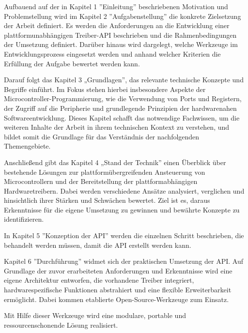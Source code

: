 Aufbauend auf der in Kapitel 1 ''Einleitung'' beschriebenen Motivation und Problemstellung wird im Kapitel 2 ''Aufgabenstellung'' die konkrete Zielsetzung der Arbeit definiert.
Es werden die Anforderungen an die Entwicklung einer plattformunabhängigen Treiber-API beschrieben und die Rahmenbedingungen der Umsetzung definiert.
Darüber hinaus wird dargelegt, welche Werkzeuge im Entwicklungsprozess eingesetzt werden und anhand welcher Kriterien die Erfüllung der Aufgabe bewertet werden kann.

Darauf folgt das Kapitel 3 „Grundlagen”, das relevante technische Konzepte und Begriffe einführt. 
Im Fokus stehen hierbei insbesondere Aspekte der Microcontroller-Programmierung, wie die Verwendung von Ports und Registern, der Zugriff auf die Peripherie und grundlegende Prinzipien der hardwarenahen Softwareentwicklung. 
Dieses Kapitel schafft das notwendige Fachwissen, um die weiteren Inhalte der Arbeit in ihrem technischen Kontext zu verstehen, und bildet somit die Grundlage für das Verständnis der nachfolgenden Themengebiete.

Anschließend gibt das Kapitel 4 „Stand der Technik” einen Überblick über bestehende Lösungen zur plattformübergreifenden Ansteuerung von Microcontrollern und der Bereitstellung der plattformabhängigen Hardwaretreibern.
Dabei werden verschiedene Ansätze analysiert, verglichen und hinsichtlich ihrer Stärken und Schwächen bewertet. 
Ziel ist es, daraus Erkenntnisse für die eigene Umsetzung zu gewinnen und bewährte Konzepte zu identifizieren.

In Kapitel 5 ''Konzeption der API'' werden die einzelnen Schritt beschrieben, die behandelt werden müssen, damit die API erstellt werden kann.

Kapitel 6 ''Durchführung'' widmet sich der praktischen Umsetzung der API.
Auf Grundlage der zuvor erarbeiteten Anforderungen und Erkenntnisse wird eine eigene Architektur entworfen, die vorhandene Treiber integriert, hardwarespezifische Funktionen abstrahiert und eine flexible Erweiterbarkeit ermöglicht.
Dabei kommen etablierte Open-Source-Werkzeuge zum Einsatz.

Mit Hilfe dieser Werkzeuge wird eine modulare, portable und ressourcenschonende Lösung realisiert.






















